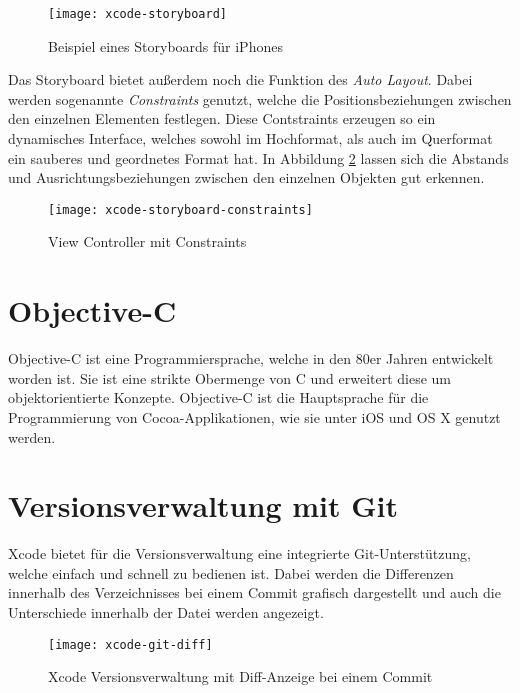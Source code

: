 \begin{figure}[htb!]
	\centering
	\texttt{[image: xcode-storyboard]}
	\caption{Beispiel eines Storyboards für iPhones}
	\label{xcode-storyboard}
\end{figure}

Das Storyboard bietet außerdem noch die Funktion des \emph{Auto Layout}. Dabei werden sogenannte \emph{Constraints} genutzt, welche die Positionsbeziehungen zwischen den einzelnen Elementen festlegen. Diese Contstraints erzeugen so ein dynamisches Interface, welches sowohl im Hochformat, als auch im Querformat ein sauberes und geordnetes Format hat.
In Abbildung \ref{xcode-storyboard-constraints} lassen sich die Abstands und Ausrichtungsbeziehungen zwischen den einzelnen Objekten gut erkennen.

\begin{figure}[htb!]
		\centering
	\texttt{[image: xcode-storyboard-constraints]}
	\caption{View Controller mit Constraints}
	\label{xcode-storyboard-constraints}
\end{figure}

\section{Objective-C}
\label{sec:tools:objectivec}
Objective-C ist eine Programmiersprache, welche in den 80er Jahren entwickelt worden ist. Sie ist eine strikte Obermenge von C und erweitert diese um objektorientierte Konzepte. Objective-C ist die Hauptsprache für die Programmierung von Cocoa-Applikationen, wie sie unter iOS und OS X genutzt werden.



\section{Versionsverwaltung mit Git}
\label{sec:tools:git}
Xcode bietet für die Versionsverwaltung eine integrierte Git-Unterstützung, welche einfach und schnell zu bedienen ist.
Dabei werden die Differenzen innerhalb des Verzeichnisses bei einem Commit grafisch dargestellt und auch die Unterschiede innerhalb der Datei werden angezeigt.

\begin{figure}[htb!]
		  \centering
	\texttt{[image: xcode-git-diff]}
	\caption{Xcode Versionsverwaltung mit Diff-Anzeige bei einem Commit}
	\label{xcode-git-diff}
\end{figure}

